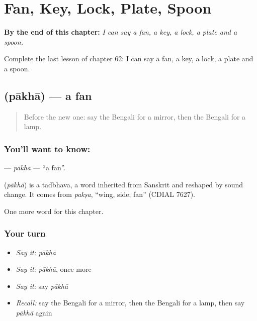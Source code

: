 
\chapter{Fan, Key, Lock, Plate, Spoon}
\label{ch:bn-fan-key-lock-plate-spoon}

\begin{chapteropening}
\textbf{By the end of this chapter:} \emph{I can say a fan, a key, a lock, a plate and a spoon.}

Complete the last lesson of chapter 62: I can say a fan, a key, a lock, a plate and a spoon.
\end{chapteropening}

\section[\texorpdfstring{\bn{পাখা} (pākhā)}{পাখা (pākhā)}]{ (pākhā) — a fan}

\label{lesson:BN-C62-pakha}



\begin{quote}
Before the new one: say the Bengali for a mirror, then the Bengali for a lamp.
\end{quote}

\subsection*{You'll want to know: }
\textbf{} — \emph{pākhā} — \textquotedblleft{}a fan\textquotedblright{}.

\begin{cousinweb}
\textbf{} (\emph{pākhā}) is a tadbhava, a word inherited from Sanskrit and reshaped by sound change. It comes from \emph{pakṣa}, \textquotedblleft{}wing, side; fan\textquotedblright{} (CDIAL 7627).
\end{cousinweb}

\begin{grammarlens}[title={What you've built}]
One more word for this chapter.
\end{grammarlens}

\subsection*{Your turn}
\begin{itemize}
\raggedright
  \item \emph{Say it:} \emph{pākhā}
  \item \emph{Say it:} \emph{pākhā}, once more
  \item \emph{Say it:} say \emph{pākhā}
  \item \emph{Recall:} say the Bengali for a mirror, then the Bengali for a lamp, then say \emph{pākhā} again
\end{itemize}

